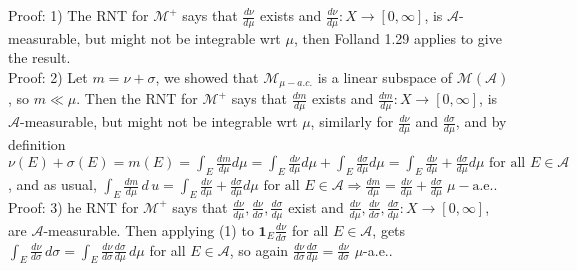 \documentclass[12pt]{article}
\newcommand{\fall}[0] { \textrm{ for all } }
\newcommand{\aew}[0] { \textrm{a.e.} }
\newcommand{\rimply}[0] { \Rightarrow }
\newcommand{\rarw}[0] { \rightarrow }
\newcommand{ \cf }[1] { \mathbf{1}_{#1} }
\newcommand{\A}[0] { \mathcal{A} }
\newcommand{\M}[0] { \mathcal{M} }
\begin{document}
\noindent
Proof: 1) The RNT for $\M^+$ says that $\frac{d\nu}{d\mu}$ exists and $\frac{d\nu}{d\mu}: X \rarw [0,\infty]$, is $\A$-measurable, but might not be integrable wrt $\mu$, then Folland 1.29 applies to give the result. \\


\noindent
Proof: 2) Let $m = \nu + \sigma$, we showed that $\M_{\mu-a.c.}$ is a linear subspace of $\M(\A)$, so $m \ll \mu$. Then the RNT for $\M^+$ says that $\frac{dm}{d\mu}$ exists and $\frac{dm}{d\mu}: X \rarw [0,\infty]$, is $\A$-measurable, but might not be integrable wrt $\mu$, similarly for $\frac{d\nu}{d\mu}$ and $\frac{d\sigma}{d\mu}$, and by definition $\nu(E) + \sigma(E) = m(E) = \int_E \frac{dm}{d\mu} d\mu = \int_E \frac{d\nu}{d\mu} d\mu + \int_E \frac{d\sigma}{d\mu} d\mu = \int_E \frac{d\nu}{d\mu} + \frac{d\sigma}{d\mu} d\mu \fall E \in \A$, and as usual, $\int_E \frac{dm}{d\mu} \, d\,u = \int_E \frac{d\nu}{d\mu} + \frac{d\sigma}{d\mu} d\mu \fall E \in \A \rimply \frac{dm}{d\mu} = \frac{d\nu}{d\mu} + \frac{d\sigma}{d\mu} \; \mu - \aew$.  \\


\noindent
Proof: 3)  he RNT for $\M^+$ says that $\frac{d\nu}{d\mu},\frac{d\nu}{d\sigma},\frac{d\sigma}{d\mu} $ exist and $\frac{d\nu}{d\mu},\frac{d\nu}{d\sigma},\frac{d\sigma}{d\mu}: X \rarw [0,\infty]$, are $\A$-measurable. Then applying (1) to $\cf{E}\frac{d\nu}{d\sigma}$ for all $E \in \A$, gets $ \int_E \frac{d\nu}{d\sigma} \, d\sigma = \int_E \frac{d\nu}{d\sigma} \frac{d\sigma}{d\mu} \, d\mu$ for all $E \in \A$, so again $ \frac{d\nu}{d\sigma} \frac{d\sigma}{d\mu}  = \frac{d\nu}{d\sigma}$ $\mu$-a.e..\\
\end{document}
